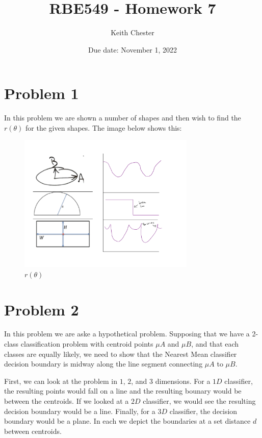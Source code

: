 \documentclass{article}
\title{RBE549 - Homework 7}
\author{Keith Chester}
\date{Due date: November 1, 2022}
\begin{document}
\maketitle

\section*{Problem 1}

In this problem we are shown a number of shapes and then wish to find the $r(\theta)$ for the given shapes. The image below shows this:

\begin{figure}[H]
    \centering
    \includegraphics[width = 0.75\textwidth]{imgs/prob_1.png}
    \caption{$r(\theta)$}
    \label{fig:prob1-1}
\end{figure}

\section*{Problem 2}

In this problem we are aske a hypothetical problem. Supposing that we have a 2-class classification problem with centroid points $\mu A$ and $\mu B$, and that each classes are equally likely, we need to show that the Nearest Mean classifier decision boundary is midway along the line segment connecting $\mu A$ to $\mu B$.

First, we can look at the problem in $1$, $2$, and $3$ dimensions. For a $1D$ classifier, the resulting points would fall on a line and the resulting bounary would be between the centroids. If we looked at a $2D$ classifier, we would see the resulting decision boundary would be a line. Finally, for a $3D$ classifier, the decision boundary would be a plane. In each we depict the boundaries at a set distance $d$ between centroids.
\end{document}
